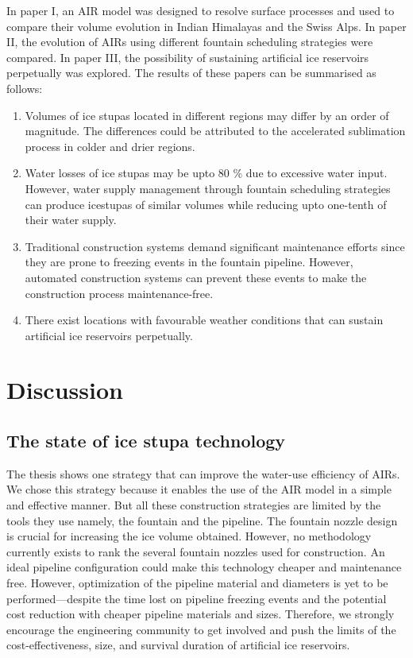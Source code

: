 In paper I, an AIR model was designed to resolve surface processes and used to compare their volume evolution
in Indian Himalayas and the Swiss Alps. In paper II, the evolution of AIRs using different fountain
scheduling strategies were compared. In paper III, the possibility of sustaining artificial ice reservoirs
perpetually was explored. The results of these papers can be summarised as follows:

\begin{enumerate} 

\item Volumes of ice stupas located in different regions may differ by an order of magnitude. The differences
  could be attributed to the accelerated sublimation process in colder and drier regions.

\item Water losses of ice stupas may be upto 80 \% due to excessive water input. However, water supply
  management through fountain scheduling strategies can produce icestupas of similar volumes while reducing upto
  one-tenth of their water supply.

\item Traditional construction systems demand significant maintenance efforts since they are prone to freezing
  events in the fountain pipeline. However, automated construction systems can prevent these events to make the
  construction process maintenance-free.

\item There exist locations with favourable weather conditions that can sustain artificial ice reservoirs
  perpetually.

\end{enumerate}

\section{Discussion}

\subsection{The state of ice stupa technology}

The thesis shows one strategy that can improve the water-use efficiency of AIRs. We chose this strategy because
it enables the use of the AIR model in a simple and effective manner. But all these construction strategies are
limited by the tools they use namely, the fountain and the pipeline. The fountain nozzle design is crucial for
increasing the ice volume obtained. However, no methodology currently exists to rank the several fountain
nozzles used for construction. An ideal pipeline configuration could make this technology cheaper and
maintenance free. However, optimization of the pipeline material and diameters is yet to be performed---despite
the time lost on pipeline freezing events and the potential cost reduction with cheaper pipeline materials and
sizes. Therefore, we strongly encourage the engineering community to get involved and push the limits of the
cost-effectiveness, size, and survival duration of artificial ice reservoirs. 

